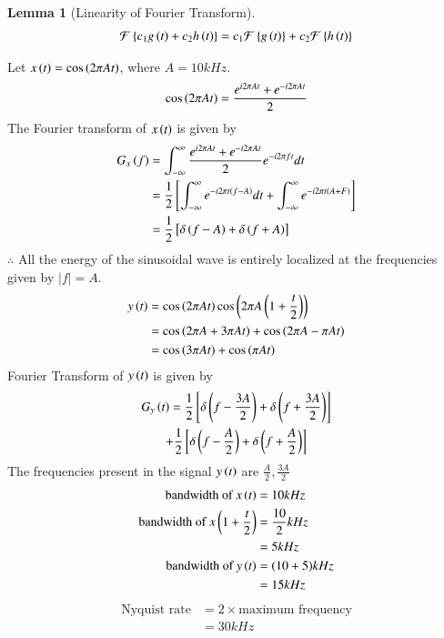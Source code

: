 \documentclass[journal,12pt,twocolumn]{IEEEtran}
\newtheorem{lemma}[theorem]{Lemma}
\begin{document}
\begin{lemma}[Linearity of Fourier Transform]
\begin{align}
    \mathcal{F}\left\{c_1g\left(t\right)+c_2h\left(t\right)\right\}=c_1\mathcal{F}\left\{g\left(t\right)\right\}+c_2\mathcal{F}\left\{h\left(t\right)\right\}
\end{align}
\end{lemma}
Let $x\left(t\right)=\cos{\ensuremath{\left(2\pi At\right)}}$, where $A=10kHz$.
\begin{align}
  \cos{\ensuremath{\left(2\pi At\right)}}=\frac{e^{i2\pi At}+e^{-i2\pi At}}{2}  
\end{align}
The Fourier transform of $x\left(t\right)$ is given by
\begin{align}
    G_x\left(f\right)&=\int_{-\infty}^{\infty}\frac{e^{i2\pi At}+e^{-i2\pi At}}{2}e^{-i2\pi ft}dt\\
    &=\frac{1}{2}{}\left[\int_{-\infty}^{\infty}e^{-i2\pi t(f-A)}dt+\int_{-\infty}^{\infty}e^{-i2\pi t(A+F)}\right]\\
    &=\frac{1}{2}{}\left[\delta\left(f-A\right)+\delta\left(f+A\right)\right]
\end{align}
$\therefore$ All the energy of the sinusoidal wave is  entirely localized at the frequencies given by $|f|=A$.
\begin{align}
    y\left(t\right)&=\cos{\ensuremath{\left(2\pi At\right)}}\cos{\ensuremath{\left(2\pi A\left(1+\frac{t}{2}\right)\right)}}\\
    &=\cos{\ensuremath{\left(2\pi A+3\pi At\right)}}+\cos{\ensuremath{\left(2\pi A-\pi At\right)}}\\
    &=\cos{\ensuremath{\left(3\pi At\right)}}+\cos{\ensuremath{\left(\pi At\right)}}
\end{align}
Fourier Transform of $y\left(t\right)$ is given by
\begin{multline}
    G_y\left(t\right)=\frac{1}{2}{}\left[\delta\left(f-\frac{3A}{2}\right)+\delta\left(f+\frac{3A}{2}\right)\right]\\+\frac{1}{2}{}\left[\delta\left(f-\frac{A}{2}\right)+\delta\left(f+\frac{A}{2}\right)\right]
\end{multline}
The frequencies present in the signal $y\left(t\right)$ are $\frac{A}{2},\frac{3A}{2}$
\begin{align}
    \text{bandwidth of } x\left(t\right) &= 10 kHz\\
    \text{bandwidth of } x\left(1+\frac{t}{2}\right) &= \frac{10}{2} kHz\\
    &= 5 kHz\\
    \text{bandwidth of } y\left(t\right) &= (10+5) kHz\\
    &= 15 kHz
\end{align}
\begin{align}
    \text{Nyquist rate} &= 2 \times \text{maximum frequency}\\
    &= 30 kHz
\end{align}
\end{document}
